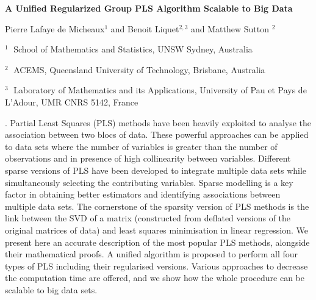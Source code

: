 \documentclass[12pt]{article}
\begin{document}
\begin{flushleft}


{\LARGE\bf A Unified Regularized Group PLS Algorithm
Scalable to Big Data}


\vspace{1.0cm}

Pierre Lafaye de Micheaux$^1$ and Benoit  Liquet$^{2,3}$ and Matthew Sutton $^2$

\begin{description}

\item $^1 \;$ School of Mathematics and Statistics, UNSW Sydney, Australia

\item $^2 \;$ ACEMS, Queensland University of Technology, Brisbane, Australia

\item $^3 \;$ Laboratory of Mathematics and its Applications, University of Pau et Pays de L'Adour, UMR CNRS 5142, France


\end{description}

\end{flushleft}


\vspace{0.75cm}

. 
Partial Least Squares (PLS) methods have been heavily exploited to analyse the association between two blocs of data. These powerful approaches can be applied to data sets where the number of variables is greater than the number of observations and in presence of high collinearity between variables. Different sparse versions of PLS have been developed to integrate multiple data sets while simultaneously selecting the contributing variables. Sparse modelling is a key factor in obtaining better estimators and identifying associations between multiple data sets. The cornerstone of the sparsity version of PLS methods is the link between the SVD of a matrix (constructed from deflated versions of the original matrices of data) and least squares minimisation in linear regression. We present here an accurate description of the most popular PLS methods, alongside their mathematical proofs. A unified algorithm is proposed to perform all four types of PLS including their regularised versions. Various approaches to decrease the computation time are offered, and we show how the whole procedure can be scalable to big data sets.
\end{document}
